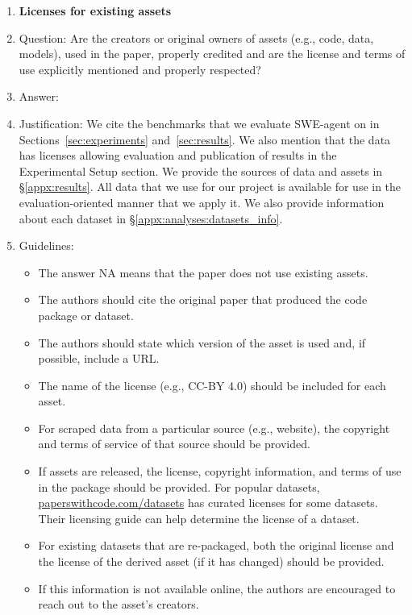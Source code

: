 \begin{enumerate}
\item {\bf Licenses for existing assets}
    \item[] Question: Are the creators or original owners of assets (e.g., code, data, models), used in the paper, properly credited and are the license and terms of use explicitly mentioned and properly respected?
    \item[] Answer: \answerYes{}
    \item[] Justification: We cite the benchmarks that we evaluate SWE-agent on in Sections~\ref{sec:experiments} and~\ref{sec:results}. We also mention that the data has licenses allowing evaluation and publication of results in the Experimental Setup section. We provide the sources of data and assets in \S\ref{appx:results}. All data that we use for our project is available for use in the evaluation-oriented manner that we apply it. We also provide information about each dataset in \S\ref{appx:analyses:datasets_info}.
    \item[] Guidelines:
    \begin{itemize}
        \item The answer NA means that the paper does not use existing assets.
        \item The authors should cite the original paper that produced the code package or dataset.
        \item The authors should state which version of the asset is used and, if possible, include a URL.
        \item The name of the license (e.g., CC-BY 4.0) should be included for each asset.
        \item For scraped data from a particular source (e.g., website), the copyright and terms of service of that source should be provided.
        \item If assets are released, the license, copyright information, and terms of use in the package should be provided. For popular datasets, \url{paperswithcode.com/datasets} has curated licenses for some datasets. Their licensing guide can help determine the license of a dataset.
        \item For existing datasets that are re-packaged, both the original license and the license of the derived asset (if it has changed) should be provided.
        \item If this information is not available online, the authors are encouraged to reach out to the asset's creators.
    \end{itemize}


\end{enumerate}
